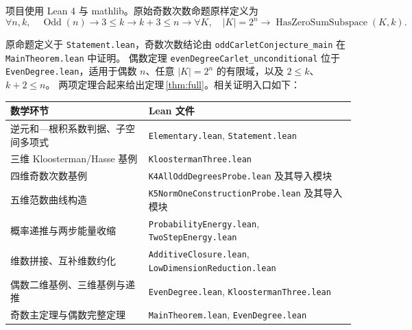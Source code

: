 \documentclass[UTF8,a4paper,11pt]{ctexart}
\numberwithin{equation}{section}
\theoremstyle{definition}
\theoremstyle{remark}
\begin{document}
项目使用 Lean 4 与 mathlib\cite{Lean4,Mathlib}。原始奇数次数命题原样定义为
\[
\forall n,k,\quad \operatorname{Odd}(n)\to 3\le k\to k+3\le n\to
\forall K,\quad |K|=2^n\to \operatorname{HasZeroSumSubspace}(K,k).
\]
{\raggedright
原命题定义于 \texttt{Statement.lean}，奇数次数结论由 \texttt{oddCarletConjecture\_main} 在 \texttt{MainTheorem.lean} 中证明。
偶数定理 \texttt{evenDegreeCarlet\_unconditional} 位于 \texttt{EvenDegree.lean}，适用于偶数 $n$、任意 $|K|=2^n$ 的有限域，以及 $2\le k$、$k+2\le n$。
两项定理合起来给出定理\,\ref{thm:full}。相关证明入口如下：
\par}
\begin{center}
\small\begin{tabular}{>{\raggedright\arraybackslash}p{}>{\raggedright\arraybackslash}p{}}
\toprule
数学环节 & Lean 文件\\
\midrule
逆元和—根积系数判据、子空间多项式 & \texttt{Elementary.lean}, \texttt{Statement.lean}\\
三维 Kloosterman/Hasse 基例 & \texttt{KloostermanThree.lean}\\
四维奇数次数基例 & \texttt{K4AllOddDegreesProbe.lean} 及其导入模块\\
五维范数曲线构造 & \texttt{K5NormOneConstructionProbe.lean} 及其导入模块\\
概率递推与两步能量收缩 & \texttt{ProbabilityEnergy.lean}, \texttt{TwoStepEnergy.lean}\\
维数拼接、互补维数约化 & \texttt{AdditiveClosure.lean}, \texttt{LowDimensionReduction.lean}\\
偶数二维基例、三维基例与递推 & \texttt{EvenDegree.lean}, \texttt{KloostermanThree.lean}\\
奇数主定理与偶数完整定理 & \texttt{MainTheorem.lean}, \texttt{EvenDegree.lean}\\
\bottomrule
\end{tabular}
\end{center}
\end{document}
